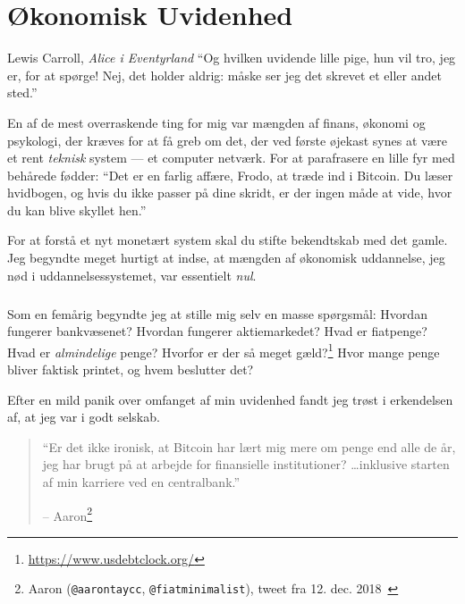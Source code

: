 \chapter{Økonomisk Uvidenhed}
\label{les:8}

\begin{chapquote}{Lewis Carroll, \textit{Alice i Eventyrland}}
\enquote{Og hvilken uvidende lille pige, hun vil tro, jeg er, for at spørge! Nej, det
holder aldrig: måske ser jeg det skrevet et eller andet sted.}
\end{chapquote}

En af de mest overraskende ting for mig var mængden af finans, økonomi og psykologi, der kræves for at få greb om det, der ved første øjekast synes at være et rent \textit{teknisk} system --- et computer netværk. For at parafrasere en lille fyr med behårede fødder: \enquote{Det er en farlig affære, Frodo, at træde ind i Bitcoin. Du læser hvidbogen, og hvis du ikke passer på dine skridt, er der ingen måde at vide, hvor du kan blive skyllet hen.}

For at forstå et nyt monetært system skal du stifte bekendtskab med det gamle. Jeg begyndte meget hurtigt at indse, at mængden af økonomisk uddannelse, jeg nød i uddannelsessystemet, var essentielt \textit{nul}.

\paragraph{}
Som en femårig begyndte jeg at stille mig selv en masse spørgsmål: Hvordan fungerer bankvæsenet? Hvordan fungerer aktiemarkedet? Hvad er fiatpenge? Hvad er \textit{almindelige} penge? Hvorfor er der så meget gæld?\footnote{\url{https://www.usdebtclock.org/}} Hvor mange penge bliver faktisk printet, og hvem beslutter det?

\newpage

Efter en mild panik over omfanget af min uvidenhed fandt jeg trøst i erkendelsen af, at jeg var i godt selskab.

\begin{quotation}\begin{samepage}
\enquote{Er det ikke ironisk, at Bitcoin har lært mig mere om penge end alle de år, jeg har brugt på at arbejde for finansielle institutioner? \ldots inklusive starten af min karriere ved en centralbank.}
\begin{flushright} -- Aaron\footnote{Aaron (\texttt{@aarontaycc}, \texttt{@fiatminimalist}), tweet fra 12. dec. 2018~\cite{aarontaycc-tweet}}
\end{flushright}\end{samepage}\end{quotation}

